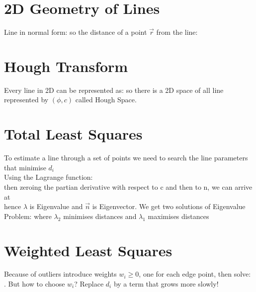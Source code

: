\documentclass[a4paper,12pt,pdftex]{scrreprt}
\begin{document}
	\section{2D Geometry of Lines} %
	\label{sec:2d_geometry}
	Line in normal form:  so the distance of a point $\vec{r}$ from the line:\\

	\section{Hough Transform} %
	\label{sec:hough_transform}
	Every line in 2D can be represented as:  so there is a 2D space of all line represented by $(\phi,c)$ called Hough Space.

	\section{Total Least Squares} %
	\label{sec:total_least_squares}
	To estimate a line through a set of points we need to search the line parameters that minimise $d_{i}$\\
	Using the Lagrange function:\\
	 then zeroing the partian derivative with respect to c and then to n, we can arrive at\\
	 hence $\lambda$ is Eigenvalue and $\vec{n}$ is Eigenvector. We get two solutions of Eigenvalue Problem:  where $\lambda_{2}$ minimises distances and $\lambda_{1}$ maximises distances

	\section{Weighted Least Squares} %
	\label{sec:weighted_least_squares}
	Because of outliers introduce weights $w_i \geq 0$, one for each edge point, then solve:\\
	.
	But how to choose $w_{i}$? Replace $d_{i}$ by a term that grows more slowly!
\end{document}
